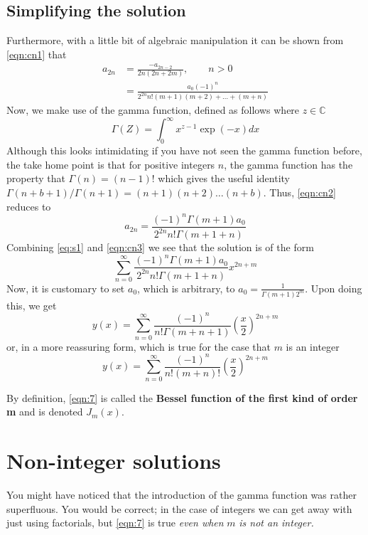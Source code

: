 \documentclass[]{article}
\begin{document}
\subsection{Simplifying the solution}
Furthermore, with a little bit of algebraic manipulation it can be shown from \eqref{eqn:cn1} that
\begin{align}
	a_{2n} &= \frac{-a_{2n-2}}{2n(2n+2m)}, \qquad n > 0 \nonumber \\
	&=\frac{a_0(-1)^n}{2^{2n}n!(m+1)(m+2)+\ldots+(m+n)} \label{eqn:cn2}
\end{align}
Now, we make use of the gamma function, defined as follows where $z \in \mathbb{C}$ 
\[\Gamma(Z) = \int_{0}^{\infty}x^{z-1}\exp(-x)dx \]
Although this looks intimidating if you have not seen the gamma function before, the take home point is that for positive integers $n$, the gamma function has the property that $\Gamma(n) = (n-1)!$ which gives the useful identity $\Gamma(n+b+1)/\Gamma(n+1) = (n+1)(n+2)\ldots(n+b)$. Thus, \eqref{eqn:cn2} reduces to
\begin{equation}\label{eqn:cn3}
a_{2n} = \frac{(-1)^n\Gamma(m+1)a_0}{2^{2n}n!\Gamma(m+1+n)}
\end{equation}
Combining \eqref{eq:s1} and \eqref{eqn:cn3} we see that the solution is of the form
\begin{equation}
\sum_{n=0}^{\infty} \frac{(-1)^n\Gamma(m+1)a_0}{2^{2n}n!\Gamma(m+1+n)}
x^{2n+m}
\end{equation}
Now, it is customary to set $a_0$, which is arbitrary, to $a_0 = \frac{1}{\Gamma(m+1)2^m}$. Upon doing this, we get
 \begin{equation} \label{eqn:7}
 y(x) =\sum_{n = 0}^{\infty} \frac{(-1)^n}{n!\Gamma(m+n+1)}
 \left(\frac{x}{2}\right)^{2n+m}
 \end{equation}
 or, in a more reassuring form, which is true for the case that $m$ is an integer
 \begin{equation} \label{eqn:8}
 y(x) = \sum_{n=0}^{\infty}\frac{(-1)^n}{n!(m+n)!}
 \left(\frac{x}{2}\right)^{2n+m}
 \end{equation}
 
 By definition, \eqref{eqn:7} is called the \textbf{Bessel function of the first kind of order m} and is denoted $J_m(x)$.
 \section{Non-integer solutions}
 You might have noticed that the introduction of the gamma function was rather superfluous. You would be correct; in the case of integers we can get away with just using factorials, but \eqref{eqn:7} is true \textit{even when }$m$\textit{ is not an integer.}
 
\end{document}
